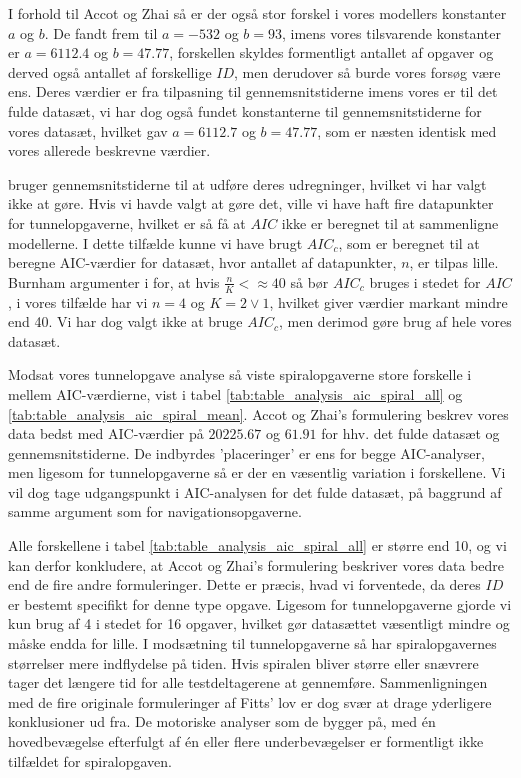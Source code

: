 I forhold til Accot og Zhai så er der også stor forskel i vores modellers konstanter $a$ og $b$. De fandt frem til $a=-532$ og $b=93$, imens vores tilsvarende konstanter er $a=6112.4$ og $b=47.77$, forskellen skyldes formentligt antallet af opgaver og derved også antallet af forskellige $ID$, men derudover så burde vores forsøg være ens. Deres værdier er fra tilpasning til gennemsnitstiderne imens vores er til det fulde datasæt, vi har dog også fundet konstanterne til gennemsnitstiderne for vores datasæt, hvilket gav $a=6112.7$ og $b=47.77$, som er næsten identisk med vores allerede beskrevne værdier.

\cite{accot1997} bruger gennemsnitstiderne til at udføre deres udregninger, hvilket vi har valgt ikke at gøre. Hvis vi havde valgt at gøre det, ville vi have haft fire datapunkter for tunnelopgaverne, hvilket er så få at $AIC$ ikke er beregnet til at sammenligne modellerne. I dette tilfælde kunne vi have brugt $AIC_c$, som er beregnet til at beregne AIC-værdier for datasæt, hvor antallet af datapunkter, $n$, er tilpas lille. Burnham argumenter i \cite{burnham2004} for, at hvis $\frac{n}{K} <\approx 40$ så bør $AIC_c$ bruges i stedet for $AIC$, i vores tilfælde har vi $n=4$ og $K=2 \vee 1$, hvilket giver værdier markant mindre end 40. Vi har dog valgt ikke at bruge $AIC_c$, men derimod gøre brug af hele vores datasæt.

Modsat vores tunnelopgave analyse så viste spiralopgaverne store forskelle i mellem AIC-værdierne, vist i tabel \ref{tab:table_analysis_aic_spiral_all} og \ref{tab:table_analysis_aic_spiral_mean}. Accot og Zhai's formulering beskrev vores data bedst med AIC-værdier på $20225.67$ og $61.91$ for hhv. det fulde datasæt og gennemsnitstiderne. De indbyrdes 'placeringer' er ens for begge AIC-analyser, men ligesom for tunnelopgaverne så er der en væsentlig variation i forskellene. Vi vil dog tage udgangspunkt i AIC-analysen for det fulde datasæt, på baggrund af samme argument som for navigationsopgaverne.

Alle forskellene i tabel \ref{tab:table_analysis_aic_spiral_all} er større end 10, og vi kan derfor konkludere, at Accot og Zhai's formulering beskriver vores data bedre end de fire andre formuleringer. Dette er præcis, hvad vi forventede, da deres $ID$ er bestemt specifikt for denne type opgave. Ligesom for tunnelopgaverne gjorde vi kun brug af 4 i stedet for 16 opgaver, hvilket gør datasættet væsentligt mindre og måske endda for lille. I modsætning til tunnelopgaverne så har spiralopgavernes størrelser mere indflydelse på tiden. Hvis spiralen bliver større eller snævrere tager det længere tid for alle testdeltagerene at gennemføre. Sammenligningen med de fire originale formuleringer af Fitts' lov er dog svær at drage yderligere konklusioner ud fra. De motoriske analyser som de bygger på, med én hovedbevægelse efterfulgt af én eller flere underbevægelser er formentligt ikke tilfældet for spiralopgaven.

